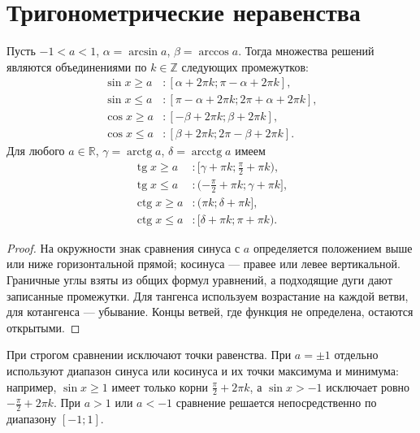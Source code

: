 \section{Тригонометрические неравенства}
\begin{theorem}
Пусть \(-1<a<1\), \(\alpha=\arcsin a\), \(\beta=\arccos a\). Тогда множества решений являются объединениями по \(k\in\mathbb Z\) следующих промежутков:
\[
\begin{aligned}
\sin x\geq a &: [\alpha+2\pi k;\pi-\alpha+2\pi k],\\
\sin x\leq a &: [\pi-\alpha+2\pi k;2\pi+\alpha+2\pi k],\\
\cos x\geq a &: [-\beta+2\pi k;\beta+2\pi k],\\
\cos x\leq a &: [\beta+2\pi k;2\pi-\beta+2\pi k].
\end{aligned}
\]
Для любого \(a\in\mathbb R\), \(\gamma=\operatorname{arctg}a\), \(\delta=\operatorname{arcctg}a\) имеем
\[
\begin{aligned}
\operatorname{tg}x\geq a &: [\gamma+\pi k;\frac\pi2+\pi k),\\
\operatorname{tg}x\leq a &: (-\frac\pi2+\pi k;\gamma+\pi k],\\
\operatorname{ctg}x\geq a &: (\pi k;\delta+\pi k],\\
\operatorname{ctg}x\leq a &: [\delta+\pi k;\pi+\pi k).
\end{aligned}
\]
\end{theorem}
\begin{proof}На окружности знак сравнения синуса с \(a\) определяется положением выше или ниже горизонтальной прямой; косинуса — правее или левее вертикальной. Граничные углы взяты из общих формул уравнений, а подходящие дуги дают записанные промежутки. Для тангенса используем возрастание на каждой ветви, для котангенса — убывание. Концы ветвей, где функция не определена, остаются открытыми.\end{proof}
При строгом сравнении исключают точки равенства. При \(a=\pm1\) отдельно используют диапазон синуса или косинуса и их точки максимума и минимума: например, \(\sin x\geq1\) имеет только корни \(\frac\pi2+2\pi k\), а \(\sin x>-1\) исключает ровно \(-\frac\pi2+2\pi k\). При \(a>1\) или \(a<-1\) сравнение решается непосредственно по диапазону \([-1;1]\).
